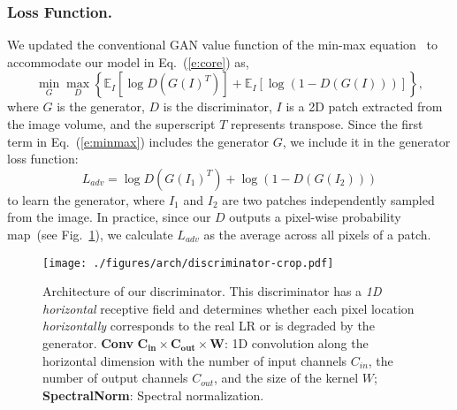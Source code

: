 \documentclass[runningheads]{llncs}
\begin{document}
\subsubsection{Loss Function.} We updated the conventional GAN value
function of the min-max equation~\cite{goodfellow-2014-gan} to accommodate
our model in Eq.~(\ref{e:core}) as,
%
\begin{equation}
  \min_G\max_D \left\{ \mathbb{E}_{I}[\log D(G(I)^T)]
              + \mathbb{E}_{I}[\log (1 - D(G(I)))] \right\},
  \label{e:minmax}
\end{equation}
%
where $G$ is the generator, $D$ is the discriminator, $I$ is a 2D
patch extracted from the image volume, and the superscript $T$
represents transpose. Since the first term in Eq.~(\ref{e:minmax})
includes the generator $G$, we include it in the generator
loss function:
%
\begin{equation}
  L_{adv} = \log D(G(I_1)^T) + \log (1 - D(G(I_2)))
  \label{e:ladv}
\end{equation}
%
to learn the generator, where $I_1$ and $I_2$ are two patches
independently sampled from the image. In practice, since our $D$
outputs a pixel-wise probability map~(see Fig.~\ref{fig:d}), we
calculate $L_{adv}$ as the average across all pixels of a patch.

\begin{figure}[t]
    \centering
    \texttt{[image: ./figures/arch/discriminator-crop.pdf]}
    \caption{Architecture of our discriminator. This discriminator has
    a \textit{1D horizontal} receptive field and determines whether
    each pixel location \textit{horizontally} corresponds to the real
    LR or is degraded by the generator. \textbf{Conv} $\bm{C_{in}
    \times C_{out} \times W}$: 1D convolution along the horizontal
    dimension with the number of input channels $C_{in}$, the number
    of output channels $C_{out}$, and the size of the kernel $W$;
    \textbf{SpectralNorm}: Spectral normalization.}
    \label{fig:d}
\end{figure}
\end{document}
